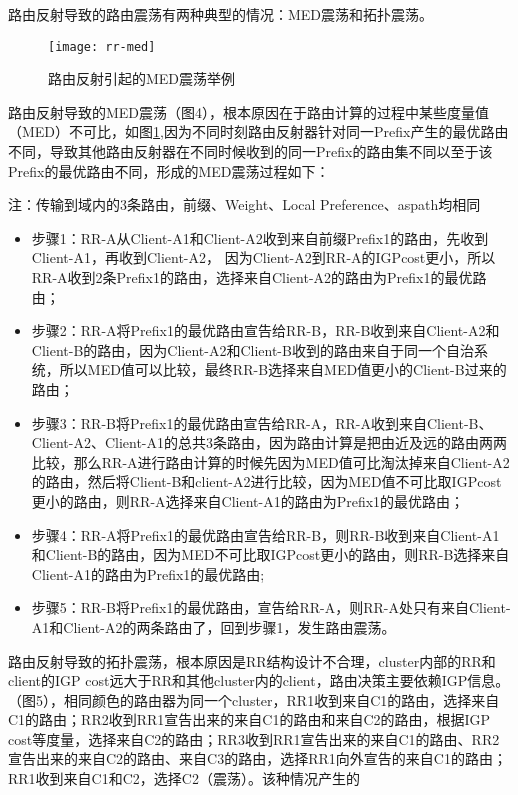 路由反射导致的路由震荡有两种典型的情况：MED震荡和拓扑震荡。

\begin{figure}
  \centering
  \texttt{[image: rr-med]}
  \caption{路由反射引起的MED震荡举例\cite{Flavel2009Stable}}
  \label{fig:rr-med}
\end{figure}


路由反射导致的MED震荡（图4），根本原因在于路由计算的过程中某些度量值（MED）不可比，如图\ref{fig:rr-med},因为不同时刻路由反射器针对同一Prefix产生的最优路由不同，导致其他路由反射器在不同时候收到的同一Prefix的路由集不同以至于该Prefix的最优路由不同，形成的MED震荡过程如下：

注：传输到域内的3条路由，前缀、Weight、Local Preference、aspath均相同

\begin{itemize}
\item 步骤1：RR-A从Client-A1和Client-A2收到来自前缀Prefix1的路由，先收到Client-A1，再收到Client-A2， 因为Client-A2到RR-A的IGPcost更小，所以RR-A收到2条Prefix1的路由，选择来自Client-A2的路由为Prefix1的最优路由；
\item 步骤2：RR-A将Prefix1的最优路由宣告给RR-B，RR-B收到来自Client-A2和Client-B的路由，因为Client-A2和Client-B收到的路由来自于同一个自治系统，所以MED值可以比较，最终RR-B选择来自MED值更小的Client-B过来的路由；
\item 步骤3：RR-B将Prefix1的最优路由宣告给RR-A，RR-A收到来自Client-B、Client-A2、Client-A1的总共3条路由，因为路由计算是把由近及远的路由两两比较，那么RR-A进行路由计算的时候先因为MED值可比淘汰掉来自Client-A2的路由，然后将Client-B和client-A2进行比较，因为MED值不可比取IGPcost更小的路由，则RR-A选择来自Client-A1的路由为Prefix1的最优路由；
\item 步骤4：RR-A将Prefix1的最优路由宣告给RR-B，则RR-B收到来自Client-A1和Client-B的路由，因为MED不可比取IGPcost更小的路由，则RR-B选择来自Client-A1的路由为Prefix1的最优路由;
\item 步骤5：RR-B将Prefix1的最优路由，宣告给RR-A，则RR-A处只有来自Client-A1和Client-A2的两条路由了，回到步骤1，发生路由震荡。
\end{itemize}


路由反射导致的拓扑震荡，根本原因是RR结构设计不合理，cluster内部的RR和client的IGP cost远大于RR和其他cluster内的client，路由决策主要依赖IGP信息。（图5），相同颜色的路由器为同一个cluster，RR1收到来自C1的路由，选择来自C1的路由；RR2收到RR1宣告出来的来自C1的路由和来自C2的路由，根据IGP cost等度量，选择来自C2的路由；RR3收到RR1宣告出来的来自C1的路由、RR2宣告出来的来自C2的路由、来自C3的路由，选择RR1向外宣告的来自C1的路由；RR1收到来自C1和C2，选择C2（震荡）。该种情况产生的
